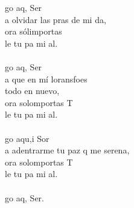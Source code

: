 \begin{cancion}%
	go aq,  Ser \\
	a olvidar las pras de mi da,\\
	ora sólimportas \\
	le tu pa mi al.\\
\jump\\
	go aq,  Ser \\
	a que en mí loransfoes \\
todo en nuevo,\\
	ora solomportas T\\
	le tu pa mi al.\\
\jump\\
	go aqu,i Sor\\
	a adentrarme  tu paz q me serena,\\
	ora solomportas T\\
	le tu pa mi al.\\
\jump\\
	go aq,  Ser. \\
\end{cancion}%
